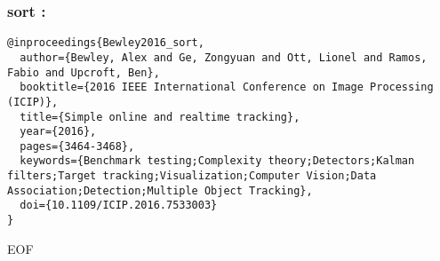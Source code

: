 \documentclass[letterpaper, 9pt, onecolumn, twoside, technote, final]{IEEEtran}
\begin{document}
\subsubsection{sort :}
\label{sec:orgc4c239b}
\begin{verbatim}
@inproceedings{Bewley2016_sort,
  author={Bewley, Alex and Ge, Zongyuan and Ott, Lionel and Ramos, Fabio and Upcroft, Ben},
  booktitle={2016 IEEE International Conference on Image Processing (ICIP)},
  title={Simple online and realtime tracking},
  year={2016},
  pages={3464-3468},
  keywords={Benchmark testing;Complexity theory;Detectors;Kalman filters;Target tracking;Visualization;Computer Vision;Data Association;Detection;Multiple Object Tracking},
  doi={10.1109/ICIP.2016.7533003}
}
\end{verbatim}

EOF
\end{document}
